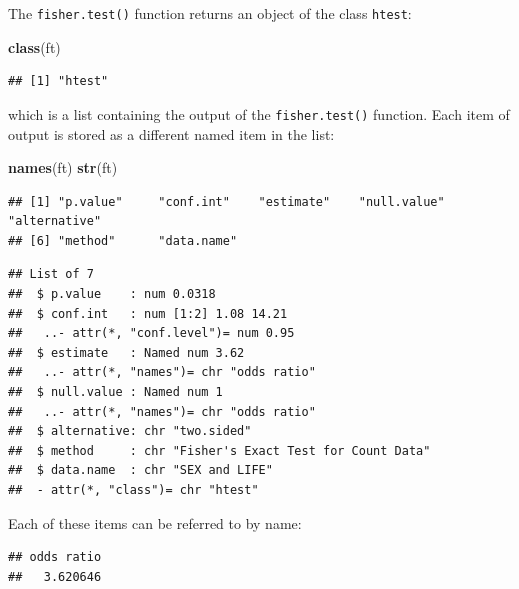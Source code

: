 \documentclass[12pt,]{book}
\newenvironment{Shaded}{\begin{snugshade}}{\end{snugshade}}
\newcommand{\KeywordTok}[1]{\textcolor[rgb]{0.13,0.29,0.53}{\textbf{#1}}}
\newcommand{\OperatorTok}[1]{\textcolor[rgb]{0.81,0.36,0.00}{\textbf{#1}}}
\newcommand{\NormalTok}[1]{#1}
\theoremstyle{definition}
\theoremstyle{definition}
\theoremstyle{definition}
\theoremstyle{remark}
\begin{document}
The \texttt{fisher.test()} function returns an object of the class
\texttt{htest}:

\begin{Shaded}
\begin{Highlighting}[]
\KeywordTok{class}\NormalTok{(ft)}
\end{Highlighting}
\end{Shaded}

\begin{verbatim}
## [1] "htest"
\end{verbatim}

which is a list containing the output of the \texttt{fisher.test()}
function. Each item of output is stored as a different named item in the
list:

\begin{Shaded}
\begin{Highlighting}[]
\KeywordTok{names}\NormalTok{(ft)}
\KeywordTok{str}\NormalTok{(ft)}
\end{Highlighting}
\end{Shaded}

\begin{verbatim}
## [1] "p.value"     "conf.int"    "estimate"    "null.value"  "alternative"
## [6] "method"      "data.name"
\end{verbatim}

\begin{verbatim}
## List of 7
##  $ p.value    : num 0.0318
##  $ conf.int   : num [1:2] 1.08 14.21
##   ..- attr(*, "conf.level")= num 0.95
##  $ estimate   : Named num 3.62
##   ..- attr(*, "names")= chr "odds ratio"
##  $ null.value : Named num 1
##   ..- attr(*, "names")= chr "odds ratio"
##  $ alternative: chr "two.sided"
##  $ method     : chr "Fisher's Exact Test for Count Data"
##  $ data.name  : chr "SEX and LIFE"
##  - attr(*, "class")= chr "htest"
\end{verbatim}

Each of these items can be referred to by name:

\begin{Shaded}
\end{Shaded}

\begin{verbatim}
## odds ratio 
##   3.620646
\end{verbatim}
\end{document}
